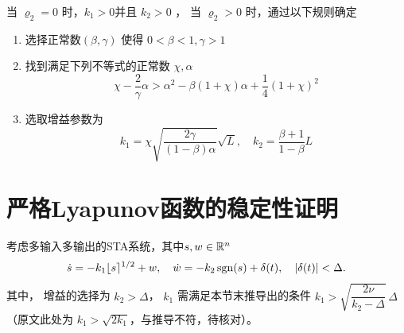 \begin{algo}\label{algo:sta-moreno}
	当 $\varrho_2=0$ 时，$k_1>0$并且 $k_2>0$ ，
	当 $\varrho_2>0$ 时，通过以下规则确定
	\begin{enumerate}
		\item  选择正常数$(\beta,\gamma)$ 使得 $0<\beta<1,\gamma>1$
		\item 找到满足下列不等式的正常数 $\chi,\alpha$
		\begin{equation}
			\chi-\frac{2}{\gamma}\alpha
			>\alpha^2-\beta (1+\chi)\alpha+\frac14 (1+\chi)^2
		\end{equation}
		\item 选取增益参数为
		\begin{equation}
			k_1=\chi \sqrt{\frac{2\gamma}{(1-\beta)\alpha}}\sqrt{L},\quad 
			k_2=\frac{\beta+1}{1-\beta}L
		\end{equation}
	\end{enumerate}
\end{algo}

\section{严格Lyapunov函数的稳定性证明}



\begin{proposition}
	\cite[Proposition 1]{morenoStrictLyapunovFunctions2014}
	考虑多输入多输出的STA系统，其中$s,w\in\mathbb{R}^n$
	\begin{equation}
		\dot{s}=-k_1 \lfloor s \rceil^{1/2}+w,\quad 
		\dot{w}=-k_2 \operatorname{sgn}(s)+\delta(t),\quad 
		|\delta(t)|<\Delta.
	\end{equation}
	其中， 增益的选择为 $k_2>\Delta$，
	$k_1$ 需满足本节末推导出的条件 $k_1>\sqrt{\dfrac{2\nu}{k_2-\Delta}}\,\Delta$
	（原文此处为 $k_1>\sqrt{2k_1}$，与推导不符，待核对）。
\end{proposition}

